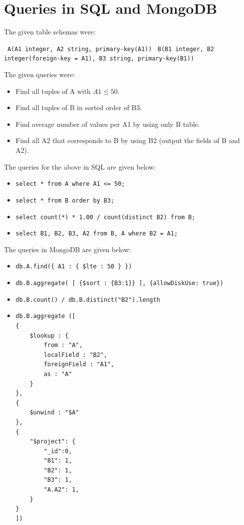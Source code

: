 \documentclass[12pt]{article}
\begin{document}
 
%

\rhead{\today}

\section{Queries in SQL and MongoDB}

The given table schemas were:
\begin{center}
    \texttt{ A(A1 integer, A2 string, primary-key(A1))}
    \newline
    \newline
    \texttt{ B(B1 integer, B2 integer(foreign-key = A1), B3 string, primary-key(B1))}
\end{center}

The given queries were:
\begin{itemize}
    \item {Find all tuples of A with $A1 \leq 50$.}
    \item {Find all tuples of B in sorted order of B3.}
    \item {Find average number of values per A1 by using only B table.}
    \item {Find all A2 that corresponds to B by using B2 (output the fields of B and A2).}
\end{itemize}
The queries for the above in SQL are given below:
\begin{itemize}
    \item \texttt{select * from A where A1 <= 50;}
    \item \texttt{select * from B order by B3;}
    \item \texttt{select count(*) * 1.00 / count(distinct B2)
from B;}
    \item \texttt{select B1, B2, B3, A2 from B, A where B2 = A1;}
\end{itemize}
The queries in MongoDB are given below:
\begin{itemize}
    \item \texttt{db.A.find(\{
    A1 : \{ \$lte : 50 \} 
\})}
    \item \texttt{db.B.aggregate( [ \{\$sort : \{B3:1\}\} ], \{allowDiskUse: true\})}
    \item \texttt{db.B.count() / db.B.distinct("B2").length}
\item {
    \begin{lstlisting}
db.B.aggregate ([
{ 
    $lookup : { 
        from : "A",
        localField : "B2",
        foreignField : "A1",
        as : "A" 
    } 
},
{
    $unwind : "$A"
},
{
    "$project": {
        "_id":0,
        "B1": 1,
        "B2": 1,
        "B3": 1,
        "A.A2": 1,
    }
}
])
    \end{lstlisting}
}
\end{itemize}
\end{document}
